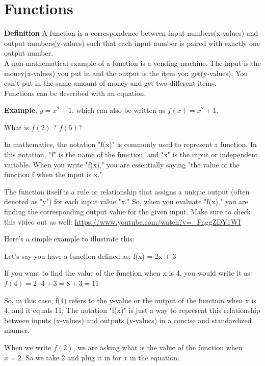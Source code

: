 \section{Functions}
\textbf{Definition} A function is a correspondence between input numbers(x-values) and output numbers(y-values) such that each input number is paired with exactly one output number. \\
A non-mathematical example of a function is a vending machine. The input is the money(x-values) you put in and the output is the item you get(y-values). You can't put in the same amount of money and get two different items. \\

Functions can be described with an equation.

\textbf{Example}. $y = x^2 + 1$, which can also be written as $f(x) = x^2 + 1$. \\
\vspace{4pt}

What is $f(2)$ ? $ f(5) ?$ \\
\vspace{4pt}

In mathematics, the notation "f(x)" is commonly used to represent a function. In this notation, "f" is the name of the function, and "x" is the input or independent variable. When you write "f(x)," you are essentially saying "the value of the function f when the input is x."

The function itself is a rule or relationship that assigns a unique output (often denoted as "y") for each input value "x." So, when you evaluate "f(x)," you are finding the corresponding output value for the given input. 
Make sure to check this video out as well: \url{https://www.youtube.com/watch?v=_FnggZDY1WI}

Here's a simple example to illustrate this:

Let's say you have a function defined as:
f(x) = 2x + 3

If you want to find the value of the function when x is 4, you would write it as:
$f(4) = 2 \cdot 4 + 3 = 8 + 3 = 11$

So, in this case, f(4) refers to the y-value or the output of the function when x is 4, and it equals 11. The notation "f(x)" is just a way to represent this relationship between inputs (x-values) and outputs (y-values) in a concise and standardized manner.

When we write $f(2)$, we are asking what is the value of the function when $x = 2$. 
So we take $2$ and plug it in for $x$ in the equation. \\

